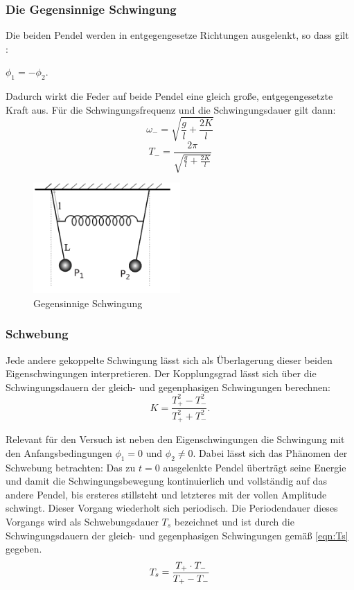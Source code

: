 \subsubsection{Die Gegensinnige Schwingung}

Die beiden Pendel werden in entgegengesetze Richtungen ausgelenkt, so dass
gilt :

$\phi_1 = -\phi_2$.

Dadurch wirkt die Feder auf beide Pendel eine gleich große,
entgegengesetzte Kraft aus. Für die Schwingungsfrequenz und die Schwingungsdauer
gilt dann:
\begin{equation}
\omega_-=\sqrt{\frac{g}{l}+\frac{2K}{l}}
\end{equation}
\begin{equation}
T_-=\frac{2\pi}{\sqrt{\frac{g}{l}+\frac{2K}{l}}}
\end{equation}
\begin{figure}[H]
  \centering
  \includegraphics[width=0.5\textwidth]{graphics/gegensinnig.png}
  \caption{Gegensinnige Schwingung \cite{Wikipedia}}
\end{figure}

\subsubsection{Schwebung}

Jede andere gekoppelte Schwingung lässt sich als Überlagerung dieser beiden
Eigenschwingungen interpretieren. Der Kopplungsgrad lässt sich über die
Schwingungsdauern der gleich- und gegenphasigen Schwingungen berechnen:
\begin{equation}
  \label{eqn:k}
  K = \frac{T_+^2-T_-^2}{T_+^2+T_-^2}.
\end{equation}

Relevant für den Versuch ist neben den
Eigenschwingungen die Schwingung mit den Anfangsbedingungen
$\phi_1 = 0$ und $\phi_2 \neq 0$.
Dabei lässt sich das Phänomen der Schwebung betrachten: Das zu $t = 0$
ausgelenkte Pendel überträgt seine Energie und damit die Schwingungsbewegung
kontinuierlich und vollständig
auf das andere Pendel, bis ersteres stillsteht und letzteres
mit der vollen Amplitude schwingt. Dieser Vorgang wiederholt sich periodisch.
Die Periodendauer dieses Vorgangs wird als Schwebungsdauer $T_s$ bezeichnet und
ist durch die Schwingungsdauern der gleich- und gegenphasigen Schwingungen
gemäß \ref{eqn:Ts} gegeben.
\begin{equation}
  \centering
  T_s  = \frac{T_+ \cdot T_-}{T_+ - T_-}
  \label{eqn:Ts}
\end{equation}

